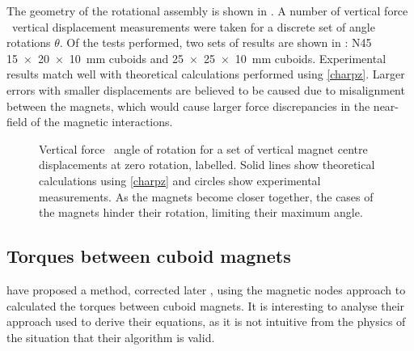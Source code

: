 \documentclass[11pt,a4paper]{memoir}
\begin{document}
The geometry of the rotational assembly is shown in .
A number of vertical force \vs\ vertical displacement measurements were taken for a discrete set of angle rotations $\theta$.
Of the tests performed, two sets of results are shown in : N45 \SI{15x20x10}{mm} cuboids and  \SI{25x25x10}{mm} cuboids.
Experimental results match well with theoretical calculations performed using \eqref{charpz}.
Larger errors with smaller displacements are believed to be caused due to misalignment between the magnets, which would cause larger force discrepancies in the near-field of the magnetic interactions.

\begin{figure}
  \begin{wide}
  \hfil
  \end{wide}
  \caption{
    Vertical force \vs\ angle of rotation for a set of vertical magnet centre displacements at zero rotation, labelled.
    Solid lines show theoretical calculations using \eqref{charpz} and circles show experimental measurements.
    As the magnets become closer together, the cases of the magnets hinder their rotation, limiting their maximum angle.
  }
\end{figure}

\subsection{Torques between cuboid magnets}

\textcite{allag2009-ietm} have proposed a method, corrected later \cite{yonnet2011-ietm}, using the magnetic nodes approach to calculated the torques between cuboid magnets.
It is interesting to analyse their approach used to derive their equations, as it is not intuitive from the physics of the situation that their algorithm is valid.
\end{document}
